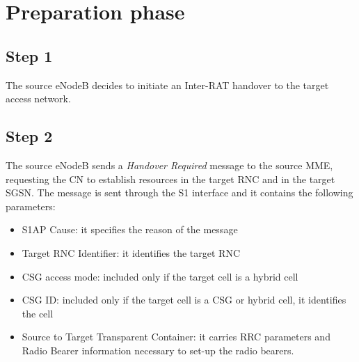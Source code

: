 \section{Preparation phase}
\subsection*{Step 1}
The source eNodeB decides to initiate an Inter-RAT handover to the target access network.



\subsection*{Step 2}
The source eNodeB sends a \emph{Handover Required} message to the
source MME, requesting the CN to establish resources in the target RNC and in the
target SGSN. The message is sent through the S1 interface and it contains the
following parameters:
\begin{itemize}
	\item S1AP Cause: it specifies the reason of the message
	\item Target RNC Identifier: it identifies the target RNC
	\item CSG access mode: included only if the target cell is a hybrid cell
	\item CSG ID: included only if the target cell is a CSG or hybrid cell, it identifies the cell
	\item Source to Target Transparent Container: it carries RRC parameters and
	Radio Bearer information necessary to set-up the radio bearers.
\end{itemize}



